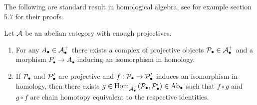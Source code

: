 \documentclass[thesis.tex]{subfiles}
\begin{document}
The following are standard result in homological algebra, see for example \cite{Wei95} section 5.7 for their proofs.
\begin{lemma} \label{Projective resolutions and weak => strong for projectives}
Let $\A$ be an abelian category with enough projectives.
\begin{enumerate}
\item For any $A_\bullet\in\A_\bullet^+$ there exists a complex of projective objects $\P_\bullet\in\A^+_\bullet$ and a morphism $P_\bullet\to A_\bullet$ inducing an isomorphism in homology.
\item If $\P_\bullet$ and $\P'_\bullet$ are projective and $f:\P_\bullet\to\P'_\bullet$ induces an isomorphism in homology, then there exists $g\in\Hom_{\A_{\bullet}^+}(\P_\bullet,\P'_\bullet)\in\Ab_{\bullet}$ such that $f\circ g$ and $g\circ f$ are chain homotopy equivalent to the respective identities.
\end{enumerate}
\end{lemma}
\end{document}
